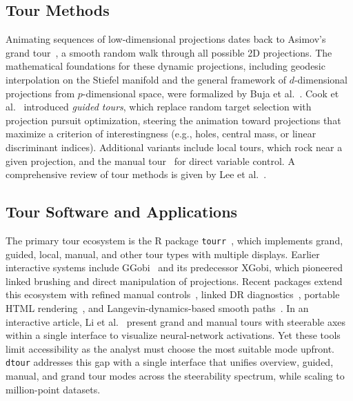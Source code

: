 \documentclass{vgtc}
\newcommand{\dtour}{\texorpdfstring{\texttt{dtour}\xspace}{dtour}}
\begin{document}
\subsection{Tour Methods}
\label{sec:tour-methods}

Animating sequences of low-dimensional projections dates back to Asimov's grand tour~\cite{asimov1985grand}, a smooth random walk through all possible 2D projections. The mathematical foundations for these dynamic projections, including geodesic interpolation on the Stiefel manifold and the general framework of $d$-dimensional projections from $p$-dimensional space, were formalized by Buja et al.~\cite{buja2005computational}. Cook et al.~\cite{cook1995grand} introduced \emph{guided tours}, which replace random target selection with projection pursuit optimization, steering the animation toward projections that maximize a criterion of interestingness (e.g., holes, central mass, or linear discriminant indices). Additional variants include local tours, which rock near a given projection, and the manual tour~\cite{cook1997manual} for direct variable control. A comprehensive review of tour methods is given by Lee et al.~\cite{lee2022tours}.

\subsection{Tour Software and Applications}
\label{sec:tour-software}

The primary tour ecosystem is the R package \texttt{tourr}~\cite{wickham2011tourr}, which implements grand, guided, local, manual, and other tour types with multiple displays. Earlier interactive systems include GGobi~\cite{swayne2003ggobi} and its predecessor XGobi, which pioneered linked brushing and direct manipulation of projections. Recent packages extend this ecosystem with refined manual controls~\cite{spyrison2020spinifex}, linked DR diagnostics~\cite{lee2020liminal}, portable HTML rendering~\cite{hart2022detourr}, and Langevin-dynamics-based smooth paths~\cite{harrison2023langevitour}. In an interactive article, Li et al.~\cite{li2020visualizing} present grand and manual tours with steerable axes within a single interface to visualize neural-network activations.
Yet these tools limit accessibility as the analyst must choose the most suitable mode upfront. \dtour{} addresses this gap with a single interface that unifies overview, guided, manual, and grand tour modes across the steerability spectrum, while scaling to million-point datasets.
\end{document}
